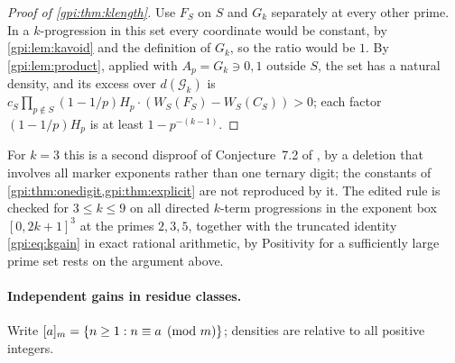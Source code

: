 \begin{proof}[Proof of \cref{gpi:thm:klength}]
Use $F_S$ on $S$ and $G_k$ separately at every other prime. In a $k$-progression in this set every
coordinate would be constant, by \cref{gpi:lem:kavoid} and the definition of $G_k$, so the ratio
would be $1$. By \cref{gpi:lem:product}, applied with $A_p=G_k\ni0,1$ outside $S$, the set has a
natural density, and its excess over $d(\mathcal G_k)$ is
$c_S\prod_{p\notin S}(1-1/p)H_p\cdot(W_S(F_S)-W_S(C_S))>0$; each factor $(1-1/p)H_p$ is at least
$1-p^{-(k-1)}$.
\end{proof}

For $k=3$ this is a second disproof of Conjecture~7.2 of \cite{McNew2015Sets}, by a deletion that
involves all marker exponents rather than one ternary digit; the constants of
\cref{gpi:thm:onedigit,gpi:thm:explicit} are not reproduced by it. The edited rule is checked for
$3\le k\le9$ on all directed $k$-term progressions in the exponent box $[0,2k+1]^3$ at the primes
$2,3,5$, together with the truncated identity \eqref{gpi:eq:kgain} in exact rational arithmetic, by
Positivity for a sufficiently large prime set rests on the argument above.

\paragraph{Independent gains in residue classes.}
Write $[a]_m=\{n\ge1:n\equiv a\pmod m\}$; densities are relative to all positive integers.

